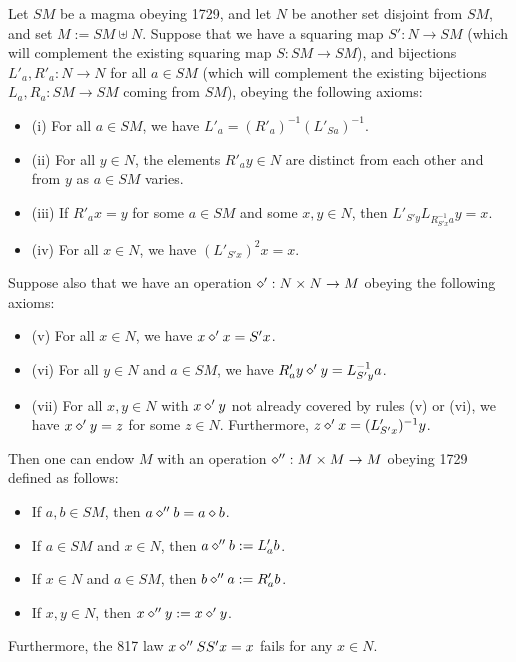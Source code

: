 \begin{theorem}\label{mag}  Let $SM$ be a magma obeying 1729, and let $N$ be another set disjoint from $SM$, and set $M := SM \uplus N$.  Suppose that we have a squaring map $S': N \to SM$ (which will complement the existing squaring map $S: SM \to SM$), and bijections $L'_a, R'_a: N \to N$ for all $a \in SM$ (which will complement the existing bijections $L_a, R_a: SM \to SM$ coming from $SM$), obeying the following axioms:
  \begin{itemize}
  \item (i) For all $a \in SM$, we have $L'_a = (R'_a)^{-1} (L'_{Sa})^{-1}$.
  \item (ii) For all $y \in N$, the elements $R'_a y \in N$ are distinct from each other and from $y$ as $a \in SM$ varies.
  \item (iii)  If $R'_a x = y$ for some $a \in SM$ and some $x,y \in N$, then $L'_{S'y} L_{R_{S'x}^{-1} a} y = x$.
  \item (iv)  For all $x \in N$, we have $(L'_{S'x})^2 x = x$.
  \end{itemize}
Suppose also that we have an operation $\diamond': N \times N \to M$ obeying the following axioms:
\begin{itemize}
  \item (v)  For all $x \in N$, we have $x \diamond' x = S'x$.
  \item (vi)  For all $y \in N$ and $a \in SM$, we have $R'_a y \diamond' y = L_{S'y}^{-1} a$.
  \item (vii)  For all $x,y \in N$ with $x \diamond' y$ not already covered by rules (v) or (vi), we have $x \diamond' y = z$ for some $z \in N$.  Furthermore, $z \diamond' x = (L'_{S'x})^{-1} y$.
\end{itemize}
Then one can endow $M$ with an operation $\diamond'': M \times M \to M$ obeying 1729 defined as follows:
\begin{itemize}
\item  If $a,b \in SM$, then $a \diamond'' b = a \diamond b$.
\item  If $a \in SM$ and $x \in N$, then $a \diamond'' b := L'_a b$.
\item  If $x \in N$ and $a \in SM$, then $b \diamond'' a := R'_a b$.
\item  If $x,y \in N$, then $x \diamond'' y := x \diamond' y$.
\end{itemize}
Furthermore, the 817 law $x \diamond'' SS' x = x$ fails for any $x \in N$.
\end{theorem}

